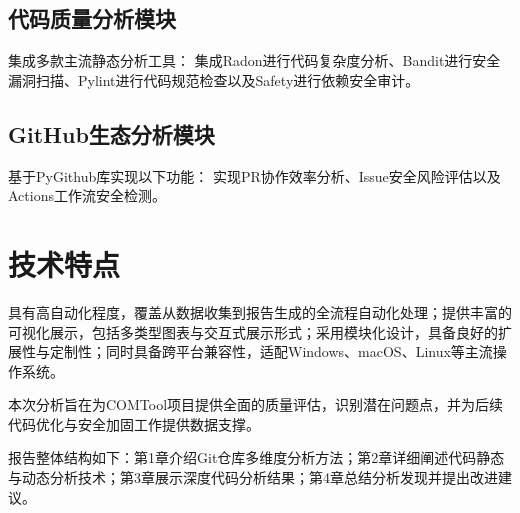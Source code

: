 \subsection{代码质量分析模块}
集成多款主流静态分析工具：
集成Radon进行代码复杂度分析、Bandit进行安全漏洞扫描、Pylint进行代码规范检查以及Safety进行依赖安全审计。

\subsection{GitHub生态分析模块}
基于PyGithub库实现以下功能：
实现PR协作效率分析、Issue安全风险评估以及Actions工作流安全检测。

\section{技术特点}

具有高自动化程度，覆盖从数据收集到报告生成的全流程自动化处理；提供丰富的可视化展示，包括多类型图表与交互式展示形式；采用模块化设计，具备良好的扩展性与定制性；同时具备跨平台兼容性，适配Windows、macOS、Linux等主流操作系统。

本次分析旨在为COMTool项目提供全面的质量评估，识别潜在问题点，并为后续代码优化与安全加固工作提供数据支撑。

报告整体结构如下：第1章介绍Git仓库多维度分析方法；第2章详细阐述代码静态与动态分析技术；第3章展示深度代码分析结果；第4章总结分析发现并提出改进建议。